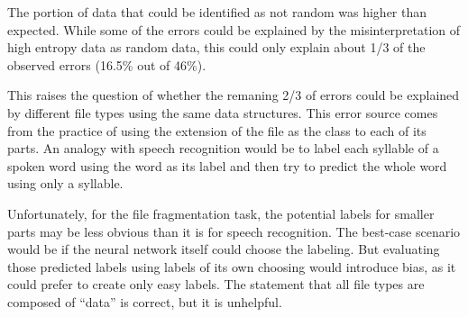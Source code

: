 The portion of data that could be identified as not random was higher than expected. While some of the errors could be explained by the misinterpretation of high entropy data as random data, this could only explain about 1/3 of the observed errors (16.5\% out of 46\%).

This raises the question of whether the remaning 2/3 of errors could be explained by different file types using the same data structures. This error source comes from the practice of using the extension of the file as the class to each of its parts. An analogy with speech recognition would be to label each syllable of a spoken word using the word as its label and then try to predict the whole word using only a syllable.

Unfortunately, for the file fragmentation task, the potential labels for smaller parts may be less obvious than it is for speech recognition. The best-case scenario would be if the neural network itself could choose the labeling. But evaluating those predicted labels using labels of its own choosing would introduce bias, as it could prefer to create only easy labels. The statement that all file types are composed of ``data'' is correct, but it is unhelpful.





